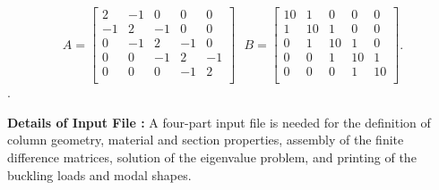 \begin{equation}
A = \left[ \begin{array}{ccccc}
 2 &  -1 &  0 &  0  &  0 \\
-1 &   2 & -1 &  0  &  0 \\
 0 &  -1 &  2 & -1  &  0 \\
 0 &   0 & -1 &  2  & -1 \\
 0 &   0 &  0 & -1  &  2 \\
\end{array} \right] ~~~ 
B = \left[ \begin{array}{ccccc}
10 &   1 &  0 &  0  &  0 \\
 1 &  10 &  1 &  0  &  0 \\
 0 &   1 & 10 &  1  &  0 \\
 0 &   0 &  1 & 10  &  1 \\
 0 &   0 &  0 &  1  & 10 \\
\end{array} \right].
\label{eq: buckle-part8}
\end{equation}.

\vspace{0.20 in}\noindent
{\bf Details of Input File :}
A four-part input file is needed for the definition of
column geometry, material and section properties,
assembly of the finite difference matrices,
solution of the eigenvalue problem,
and printing of the buckling loads and modal shapes.

